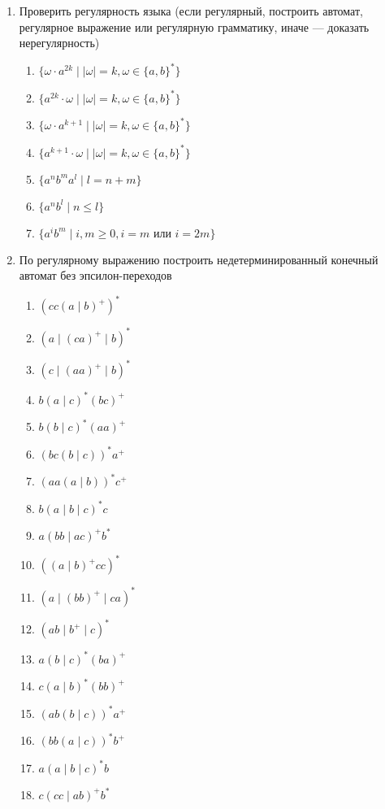 \documentclass[12pt]{article}
\begin{document}
\begin{enumerate}
\begin{enumerate}[label=\arabic*)]
  \end{enumerate}

  \item Проверить регулярность языка (если регулярный, построить автомат, регулярное выражение или регулярную грамматику, иначе --- доказать нерегулярность)

  \begin{enumerate}[label=\arabic*)]
    \setlength\itemsep{0.8em}
    \setcounter{enumii}{2}
    \item $\{ \omega \cdot a^{2k} \mid |\omega| = k, \omega \in \{a, b\}^* \}$
    \item $\{ a^{2k} \cdot \omega \mid |\omega| = k, \omega \in \{a, b\}^* \}$
    \item $\{ \omega \cdot a^{k+1} \mid |\omega| = k, \omega \in \{a, b\}^* \}$
    \item $\{ a^{k+1} \cdot \omega \mid |\omega| = k, \omega \in \{a, b\}^* \}$
    \item $\{ a^n b^m a^l \mid l = n + m \}$
    \item $\{ a^n b^l \mid n \le l\}$
    \item $\{ a^i b^m \mid i, m \ge 0, i = m \text{ или } i = 2m \}$
  \end{enumerate}

  \item По регулярному выражению построить недетерминированный конечный автомат без эпсилон-переходов

  \begin{enumerate}[label=\arabic*)]
    \setlength\itemsep{0.8em}
    \setcounter{enumii}{3}
    \item $(c c (a \mid b)^+)^*$
    \item $(a \mid (ca)^+ \mid b)^*$
    \item $(c \mid (aa)^+ \mid b)^*$
    \item $b (a \mid c)^* (bc)^+$
    \item $b (b \mid c)^* (aa)^+$
    \item $(bc (b \mid c))^* a^+$
    \item $(aa (a \mid b))^* c^+$
    \item $b (a \mid b \mid c)^* c$
    \item $a (bb \mid ac)^+ b^*$
    \item $((a \mid b)^+ c c)^*$
    \item $(a \mid (bb)^+ \mid ca)^*$
    \item $(ab \mid b^+ \mid c)^*$
    \item $a (b \mid c)^* (ba)^+$
    \item $c (a \mid b)^* (bb)^+$
    \item $(ab (b \mid c))^* a^+$
    \item $(bb (a \mid c))^* b^+$
    \item $a (a \mid b \mid c)^* b$
    \item $c (cc \mid ab)^+ b^*$
  \end{enumerate}
\end{enumerate}
\end{document}

